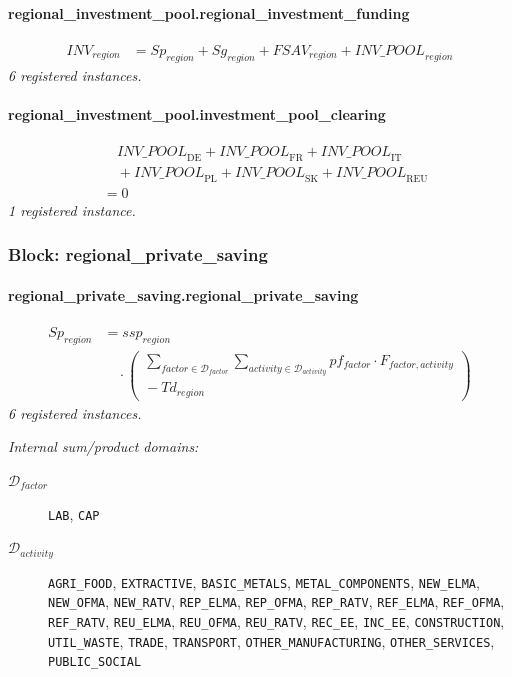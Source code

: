 \documentclass[11pt]{article}
\begin{document}
\paragraph{regional\_investment\_pool.regional\_investment\_funding}
\begin{align*}
INV_{region} &= Sp_{region} + Sg_{region} + FSAV_{region} + {INV\_POOL}_{region}
\end{align*}
\noindent\emph{6 registered instances.}\par
\paragraph{regional\_investment\_pool.investment\_pool\_clearing}
\begin{align*}
&\quad {INV\_POOL}_{\text{DE}} + {INV\_POOL}_{\text{FR}} + {INV\_POOL}_{\text{IT}}\\
&\quad {}+ {INV\_POOL}_{\text{PL}} + {INV\_POOL}_{\text{SK}} + {INV\_POOL}_{\text{REU}}\\
&= 0
\end{align*}
\noindent\emph{1 registered instance.}\par
\subsubsection*{Block: regional\_private\_saving}
\paragraph{regional\_private\_saving.regional\_private\_saving}
\begin{align*}
Sp_{region} &= ssp_{region}\\
&\quad {}\cdot (\begin{aligned}
\sum_{factor \in \mathcal{D}_{factor}} \sum_{activity \in \mathcal{D}_{activity}} pf_{factor} \cdot F_{factor,activity}\\
{}- Td_{region}
\end{aligned})
\end{align*}
\noindent\emph{6 registered instances.}\par
\noindent\emph{Internal sum/product domains:}\par
\begin{description}
\item[\(\mathcal{D}_{factor}\)] \texttt{LAB}, \texttt{CAP}
\item[\(\mathcal{D}_{activity}\)] \texttt{AGRI\_FOOD}, \texttt{EXTRACTIVE}, \texttt{BASIC\_METALS}, \texttt{METAL\_COMPONENTS}, \texttt{NEW\_ELMA}, \texttt{NEW\_OFMA}, \texttt{NEW\_RATV}, \texttt{REP\_ELMA}, \texttt{REP\_OFMA}, \texttt{REP\_RATV}, \texttt{REF\_ELMA}, \texttt{REF\_OFMA}, \texttt{REF\_RATV}, \texttt{REU\_ELMA}, \texttt{REU\_OFMA}, \texttt{REU\_RATV}, \texttt{REC\_EE}, \texttt{INC\_EE}, \texttt{CONSTRUCTION}, \texttt{UTIL\_WASTE}, \texttt{TRADE}, \texttt{TRANSPORT}, \texttt{OTHER\_MANUFACTURING}, \texttt{OTHER\_SERVICES}, \texttt{PUBLIC\_SOCIAL}
\end{description}
\end{document}
